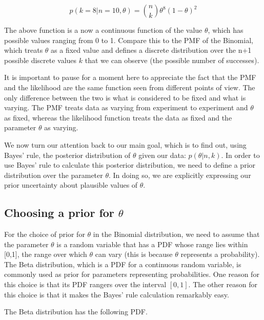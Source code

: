 \documentclass[12pt,]{krantz}
\begin{document}
\begin{equation}
p(k=8 | n= 10, \theta) = \binom{n}{k} \theta^8 (1-\theta)^{2}
\end{equation}

The above function is a now a continuous function of the value \(\theta\), which has possible values ranging from 0 to 1. Compare this to the PMF of the Binomial, which treats \(\theta\) as a fixed value and defines a discrete distribution over the n+1 possible discrete values \(k\) that we can observe (the possible number of successes).

It is important to pause for a moment here to appreciate the fact that the PMF and the likelihood are the same function seen from different points of view. The only difference between the two is what is considered to be fixed and what is varying. The PMF treats data as varying from experiment to experiment and \(\theta\) as fixed, whereas the likelihood function treats the data as fixed and the parameter \(\theta\) as varying.

We now turn our attention back to our main goal, which is to find out, using Bayes' rule, the posterior distribution of \(\theta\) given our data: \(p(\theta|n,k)\). In order to use Bayes' rule to calculate this posterior distribution, we need to define a prior distribution over the parameter \(\theta\). In doing so, we are explicitly expressing our prior uncertainty about plausible values of \(\theta\).

\hypertarget{choosing-a-prior-for-theta}{%
\subsection{\texorpdfstring{Choosing a prior for \(\theta\)}{Choosing a prior for \textbackslash{}theta}}\label{choosing-a-prior-for-theta}}

For the choice of prior for \(\theta\) in the Binomial distribution, we need to assume that the parameter \(\theta\) is a random variable that has a PDF whose range lies within {[}0,1{]}, the range over which \(\theta\) can vary (this is because \(\theta\) represents a probability). The Beta distribution, which is a PDF for a continuous random variable, is commonly used as prior for parameters representing probabilities. One reason for this choice is that its PDF rangers over the interval \([0,1]\). The other reason for this choice is that it makes the Bayes' rule calculation remarkably easy.

The Beta distribution has the following PDF.
\end{document}
